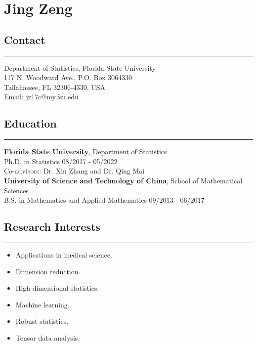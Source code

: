 \documentclass[10pt, oneside]{article}
\title{\vspace{-5em}}
\date{}
\begin{document}
\maketitle

\section*{Jing Zeng}
\vspace{10pt}

\subsection*{Contact}
\noindent\rule{\textwidth}{1pt}
Department of Statistics, Florida State University\\
117 N. Woodward Ave., P.O. Box 3064330\\
Tallahassee, FL 32306-4330, USA\\
Email: jz17c@my.fsu.edu

\subsection*{Education}
\noindent\rule{\textwidth}{1pt}
\textbf{Florida State University}, Department of Statistics\\
Ph.D. in Statistics \hfill 08/2017 - 05/2022\\
Co-advisors: Dr. Xin Zhang and Dr. Qing Mai\\[-2mm]

\textbf{University of Science and Technology of China}, School of Mathematical Sciences\\
B.S. in Mathematics and Applied Mathematics \hfill 09/2013 - 06/2017\\

\subsection*{Research Interests}
\noindent\rule{\textwidth}{1pt}
\vspace{-6mm}
\begin{itemize}[itemsep=-1pt]
    \item Applications in medical science.
    \item Dimension reduction.
    \item High-dimensional statistics.
    \item Machine learning.
    \item Robust statistics.
    \item Tensor data analysis.
\end{itemize}
\end{document}
